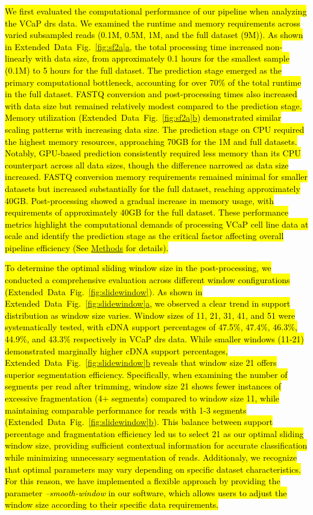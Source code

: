 \documentclass[pdflatex,sn-nature, lineno]{sn-jnl}%
\newcommand{\edfigref}[2]{Extended Data Fig.~\hyperref[#1]{\ref*{#1}#2}}
\begin{document}
\hl{We first evaluated the computational performance of our pipeline when analyzing the VCaP \mbox{\gls{drs}} data. We examined the runtime and memory requirements across varied subsampled reads (0.1M, 0.5M, 1M, and the full dataset (9M)).
	As shown in \mbox{\edfigref{fig:sf2a}{a}}, the total processing time increased non-linearly with data size, from approximately 0.1 hours for the smallest sample (0.1M) to 5 hours for the full dataset. The prediction stage emerged as the primary computational bottleneck, accounting for over 70\% of the total runtime in the full dataset. FASTQ conversion and post-processing times also increased with data size but remained relatively modest compared to the prediction stage.
	Memory utilization (\mbox{\edfigref{fig:sf2a}{b}}) demonstrated similar scaling patterns with increasing data size.
	The prediction stage on CPU required the highest memory resources, approaching 70GB for the 1M and full datasets.
	Notably, GPU-based prediction consistently required less memory than its CPU counterpart across all data sizes, though the difference narrowed as data size increased.
	FASTQ conversion memory requirements remained minimal for smaller datasets but increased substantially for the full dataset, reaching approximately 40GB.
	Post-processing showed a gradual increase in memory usage, with requirements of approximately 40GB for the full dataset.
	These performance metrics highlight the computational demands of processing VCaP cell line data at scale and identify the prediction stage as the critical factor affecting overall pipeline efficiency (See \mbox{\hyperref[sec:methods]{Methods}} for details).}

\hl{To determine the optimal sliding window size in the post-processing, we conducted a comprehensive evaluation across different window configurations (\mbox{\edfigref{fig:slidewindow}{}}).
	As shown in \mbox{\edfigref{fig:slidewindow}{a}}, we observed a clear trend in support distribution as window size varies.
	Window sizes of 11, 21, 31, 41, and 51 were systematically tested, with cDNA support percentages of 47.5\%, 47.4\%, 46.3\%, 44.9\%, and 43.3\% respectively in VCaP \mbox{\gls{drs}} data.
	While smaller windows (11-21) demonstrated marginally higher cDNA support percentages, \mbox{\edfigref{fig:slidewindow}{b}} reveals that window size 21 offers superior segmentation efficiency.
	Specifically, when examining the number of segments per read after trimming, window size 21 shows fewer instances of excessive fragmentation (4+ segments) compared to window size 11, while maintaining comparable performance for reads with 1-3 segments (\mbox{\edfigref{fig:slidewindow}{b}}).
	This balance between support percentage and fragmentation efficiency led us to select 21 as our optimal sliding window size, providing sufficient contextual information for accurate classification while minimizing unnecessary segmentation of reads.
	Additionaly, we recognize that optimal parameters may vary depending on specific dataset characteristics. For this reason, we have implemented a flexible approach by providing the parameter \emph{--smooth-window} in our software, which allows users to adjust the window size according to their specific data requirements.}
\end{document}
